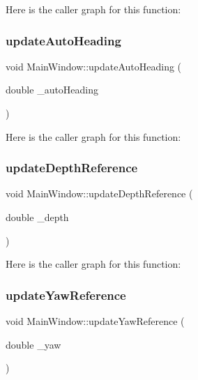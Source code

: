 Here is the caller graph for this function\+:
\mbox{\label{class_main_window_a3396959981d06581fb8b10f19cbded2a}} 
\subsubsection{\texorpdfstring{update\+Auto\+Heading}{updateAutoHeading}}
{\footnotesize\ttfamily void Main\+Window\+::update\+Auto\+Heading (\begin{DoxyParamCaption}\item[{double}]{\+\_\+auto\+Heading }\end{DoxyParamCaption})\hspace{0.3cm}{\ttfamily [signal]}}

Here is the caller graph for this function\+:
\mbox{\label{class_main_window_a5f74d765bf269b11fa170d7883fbf134}} 
\subsubsection{\texorpdfstring{update\+Depth\+Reference}{updateDepthReference}}
{\footnotesize\ttfamily void Main\+Window\+::update\+Depth\+Reference (\begin{DoxyParamCaption}\item[{double}]{\+\_\+depth }\end{DoxyParamCaption})\hspace{0.3cm}{\ttfamily [signal]}}

Here is the caller graph for this function\+:
\mbox{\label{class_main_window_ae64085dc959c76a25d207446e5052d3c}} 
\subsubsection{\texorpdfstring{update\+Yaw\+Reference}{updateYawReference}}
{\footnotesize\ttfamily void Main\+Window\+::update\+Yaw\+Reference (\begin{DoxyParamCaption}\item[{double}]{\+\_\+yaw }\end{DoxyParamCaption})\hspace{0.3cm}{\ttfamily [signal]}}

